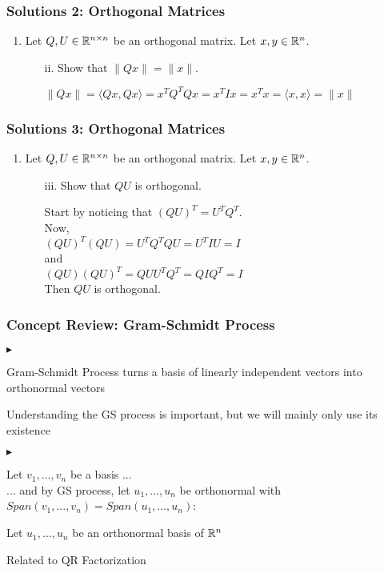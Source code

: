 \documentclass[table]{beamer}
\renewenvironment{itemize}
\renewenvironment{enumerate}%
{\begin{list}{\arabic{enumi}.}%
      {\setlength{\leftmargin}{2.5em}%
       \setlength{\itemsep}{-\parsep}%
       \setlength{\topsep}{-\parskip}%
       \usecounter{enumi}}%
 }{\end{list}}
\renewenvironment{itemize}%
{\begin{list}{$\blacktriangleright$}%
      {\setlength{\leftmargin}{2.5em}%
       \setlength{\itemsep}{-\parsep}%
       \setlength{\topsep}{-\parskip}%
       \usecounter{enumi}}%
 }{\end{list}}
\begin{document}
\begin{frame}
\frametitle{Solutions 2: Orthogonal Matrices}
\begin{enumerate}
\item Let $Q,U \in \mathbb{R}^{n \times n}$ be an orthogonal matrix. Let $x,y \in \mathbb{R}^n$.
\begin{enumerate}
\item[ii.] Show that $\|Qx\| = \|x\|.$\\
\begin{solution}
$\|Qx\| = \langle Qx, Qx \rangle = x^TQ^TQx = x^T I x = x^Tx = \langle x, x \rangle = \|x\|$
\end{solution}
\end{enumerate}
\end{enumerate}
\end{frame}
\begin{frame}
\frametitle{Solutions 3: Orthogonal Matrices}
\begin{enumerate}
\item Let $Q,U \in \mathbb{R}^{n \times n}$ be an orthogonal matrix. Let $x,y \in \mathbb{R}^n$.
\begin{enumerate}
\item[iii.] Show that $QU$ is orthogonal.
\begin{solution}
Start by noticing that $(QU)^T = U^TQ^T.$ \\
Now,\\
\qquad $(QU)^T(QU) = U^TQ^TQU = U^T I U = I$\\
and \\
\qquad $(QU)(QU)^T = QUU^TQ^T = Q I Q^T = I$ \\
Then $QU$ is orthogonal.
\end{solution}
\end{enumerate}
\end{enumerate}
\end{frame}



\begin{frame}
\frametitle{Concept Review: Gram-Schmidt Process}
\begin{itemize}
\item Gram-Schmidt Process turns a basis of linearly independent vectors into orthonormal vectors
\item Understanding the GS process is important, but we will mainly only use its existence
\begin{itemize}
\item Let $v_1,...,v_n$ be a basis ... \\
... and by GS process, let $u_1,...,u_n$ be orthonormal with $Span(v_1,...,v_n)=Span(u_1,...,u_n)$:
\item Let $u_1,...,u_n$ be an orthonormal basis of $\mathbb{R}^n$
\end{itemize}

\item Related to QR Factorization
\end{itemize}
\end{frame}
\end{document}
